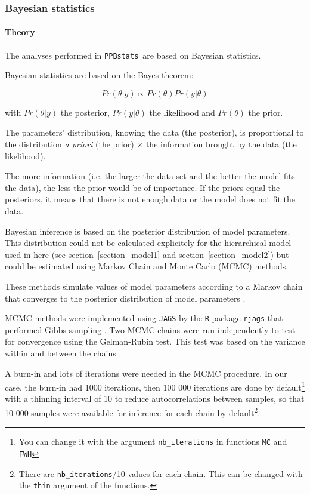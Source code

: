 \documentclass{book}\usepackage[]{graphicx}\usepackage[]{color}
\newcommand{\pack}{\texttt{PPBstats}}
\begin{document}
\subsubsection{Bayesian statistics}
\label{section_bayes}

\paragraph{Theory}

The analyses performed in \pack~are based on Bayesian statistics.

Bayesian statistics are based on the Bayes theorem:

\begin{displaymath}
Pr(\theta|y) \propto Pr(\theta) Pr(y|\theta)
\end{displaymath}

with
$Pr(\theta|y)$ the posterior,
$Pr(y|\theta)$ the likelihood and
$Pr(\theta)$ the prior.

The parameters' distribution, knowing the data (the posterior), is proportional to the distribution \textit{a  priori} (the prior) $\times$ the information brought by the data (the likelihood).

The more information (i.e. the larger the data set and the better the model fits the data), the less the prior would be of importance.
If the priors equal the posteriors, it means that there is not enough data or the model does not fit the data.


Bayesian inference is based on the posterior distribution of model parameters.
This distribution could not be calculated explicitely for the hierarchical model used in here (see section~\ref{section_model1} and section~\ref{section_model2}) but could be estimated using Markov Chain and Monte Carlo (MCMC) methods.

These methods simulate values of model parameters according to a Markov chain that converges to the posterior distribution of model parameters \citep{robert_bayesian_2001}.

MCMC methods were implemented using \texttt{JAGS} by the \texttt{R} package \texttt{rjags} that performed Gibbs sampling \citep{robert_bayesian_2001}.
Two MCMC chains were run independently to test for convergence using the Gelman-Rubin test.
This test was based on the variance within and between the chains \citep{gelman_inference_1992}.

A burn-in and lots of iterations were needed in the MCMC procedure.
In our case, the burn-in had 1000 iterations, then 100 000 iterations are done by default\footnote{You can change it with the argument \texttt{nb\_iterations} in functions \texttt{MC} and \texttt{FWH}} with a thinning interval of 10 to reduce autocorrelations between samples, so that 10 000 samples were available for inference for each chain by default\footnote{There are \texttt{nb\_iterations}/10 values for each chain. This can be changed with the \texttt{thin} argument of the functions.}.
\end{document}
